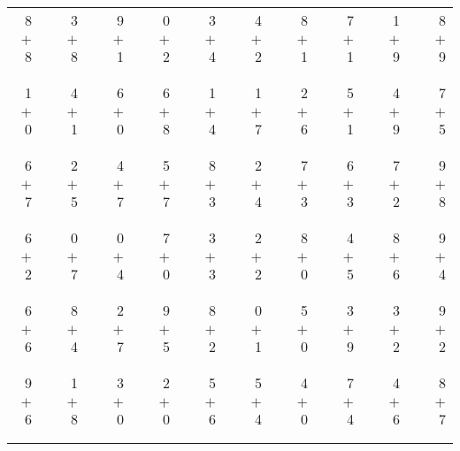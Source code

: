 \documentclass[12pt, letterpaper]{article}
\begin{document}
\begin{tabular}{rrrrrrrrrrrrrrrrrrr}
8 & & 3 & & 9 & & 0 & & 3 & & 4 & & 8 & & 7 & & 1 & & 8\\
$+$ 8 & & $+$ 8 & & $+$ 1 & & $+$ 2 & & $+$ 4 & & $+$ 2 & & $+$ 1 & & $+$ 1 & & $+$ 9 & & $+$ 9\\
\cline{1-1} \cline{3-3} \cline{5-5} \cline{7-7} \cline{9-9} \cline{11-11} \cline{13-13} \cline{15-15} \cline{17-17} \cline{19-19} \\ \\
1 & & 4 & & 6 & & 6 & & 1 & & 1 & & 2 & & 5 & & 4 & & 7\\
$+$ 0 & & $+$ 1 & & $+$ 0 & & $+$ 8 & & $+$ 4 & & $+$ 7 & & $+$ 6 & & $+$ 1 & & $+$ 9 & & $+$ 5\\
\cline{1-1} \cline{3-3} \cline{5-5} \cline{7-7} \cline{9-9} \cline{11-11} \cline{13-13} \cline{15-15} \cline{17-17} \cline{19-19} \\ \\
6 & & 2 & & 4 & & 5 & & 8 & & 2 & & 7 & & 6 & & 7 & & 9\\
$+$ 7 & & $+$ 5 & & $+$ 7 & & $+$ 7 & & $+$ 3 & & $+$ 4 & & $+$ 3 & & $+$ 3 & & $+$ 2 & & $+$ 8\\
\cline{1-1} \cline{3-3} \cline{5-5} \cline{7-7} \cline{9-9} \cline{11-11} \cline{13-13} \cline{15-15} \cline{17-17} \cline{19-19} \\ \\
6 & & 0 & & 0 & & 7 & & 3 & & 2 & & 8 & & 4 & & 8 & & 9\\
$+$ 2 & & $+$ 7 & & $+$ 4 & & $+$ 0 & & $+$ 3 & & $+$ 2 & & $+$ 0 & & $+$ 5 & & $+$ 6 & & $+$ 4\\
\cline{1-1} \cline{3-3} \cline{5-5} \cline{7-7} \cline{9-9} \cline{11-11} \cline{13-13} \cline{15-15} \cline{17-17} \cline{19-19} \\ \\
6 & & 8 & & 2 & & 9 & & 8 & & 0 & & 5 & & 3 & & 3 & & 9\\
$+$ 6 & & $+$ 4 & & $+$ 7 & & $+$ 5 & & $+$ 2 & & $+$ 1 & & $+$ 0 & & $+$ 9 & & $+$ 2 & & $+$ 2\\
\cline{1-1} \cline{3-3} \cline{5-5} \cline{7-7} \cline{9-9} \cline{11-11} \cline{13-13} \cline{15-15} \cline{17-17} \cline{19-19} \\ \\
9 & & 1 & & 3 & & 2 & & 5 & & 5 & & 4 & & 7 & & 4 & & 8\\
$+$ 6 & & $+$ 8 & & $+$ 0 & & $+$ 0 & & $+$ 6 & & $+$ 4 & & $+$ 0 & & $+$ 4 & & $+$ 6 & & $+$ 7\\
\cline{1-1} \cline{3-3} \cline{5-5} \cline{7-7} \cline{9-9} \cline{11-11} \cline{13-13} \cline{15-15} \cline{17-17} \cline{19-19} \\ \\

\end{tabular}
\end{document}
